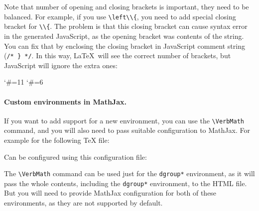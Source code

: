 Note that number of opening and closing brackets is important, they need to be balanced. 
For example, if you use \verb|\left\\{|, you need to add special closing bracket for \verb|\\{|. 
The problem is that this closing bracket can cause syntax error in the generated JavaScript, 
as the opening bracket was contents of the string. You can fix that by enclosing the closing bracket
in JavaScript comment string (\verb|/* } */|. In this way, \LaTeX\ will see the correct number of brackets,
but JavaScript will ignore the extra ones:

\begin{texsource}
\catcode`\#=11
\catcode`\#=6

\EndPreamble
\end{texsource}

\paragraph{Custom environments in MathJax.}\label{sec:mathjax_env}

If you want to add support for a new environment, you can use the \verb|\VerbMath| command, and you will
also need to pass suitable configuration to MathJax. For example for the following TeX file:


Can be configured using this configuration file:

\begin{texsource}
 
\EndPreamble
\end{texsource}

The \verb|\VerbMath| command can be used just for the \verb|dgroup*| environment, as it will pass the
whole contents, including the \verb|dgroup*| environment, to the HTML file. But you will need to 
provide MathJax configuration for both of these environments, as they are not supported by default.


